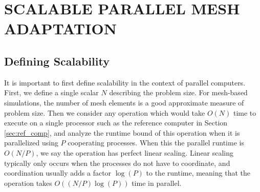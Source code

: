 
\chapter{SCALABLE PARALLEL MESH ADAPTATION}
\label{chap:parallel}
\nocite{ibanez2016pumi}
\nocite{ibanez2016hybrid}
\nocite{ibanez2016mesh}

\section{Defining Scalability}
\label{sec:scalable}

It is important to first define scalability in the context of
parallel computers.
First, we define a single scalar $N$ describing the problem size.
For mesh-based simulations, the number of mesh elements
is a good approximate measure of problem size.
Then we consider any operation which would take $O(N)$ time to execute
on a single processor such as the reference computer
in Section \ref{sec:ref_comp}, and analyze the runtime bound
of this operation when it is parallelized using $P$ cooperating processes.
When this the parallel runtime is $O(N/P)$, we say the operation
has perfect linear scaling.
Linear scaling typically only occurs when the processes do not have to coordinate,
and coordination usually adds a factor $\log(P)$ to the runtime,
meaning that the operation takes $O((N/P)\log(P))$ time in parallel.

